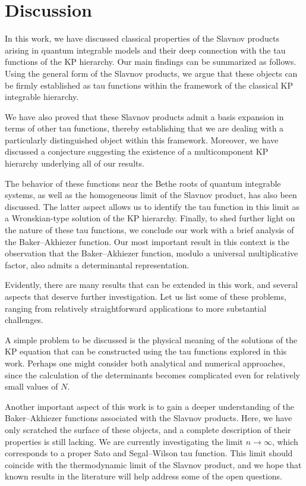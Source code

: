 \documentclass[a4paper,11pt]{amsart}
\begin{document}
\section{Discussion}

In this work, we have discussed classical properties of the Slavnov
products arising in quantum integrable models and their deep
connection with the tau functions of the KP hierarchy. Our main
findings can be summarized as follows. Using the general form of the
Slavnov products, we argue that these objects can be firmly
established as tau functions within the framework of the classical KP
integrable hierarchy.

We have also proved that these Slavnov products admit a basis
expansion in terms of other tau functions, thereby establishing that
we are dealing with a particularly distinguished object within this
framework. Moreover, we have discussed a conjecture suggesting the
existence of a multicomponent KP hierarchy underlying all of our
results.

The behavior of these functions near the Bethe roots of quantum
integrable systems, as well as the homogeneous limit of the Slavnov
product, has also been discussed. The latter aspect allows us to
identify the tau function in this limit as a Wronskian-type solution
of the KP hierarchy. Finally, to shed further light on the nature of
these tau functions, we conclude our work with a brief analysis of the
Baker--Akhiezer function. Our most important result in this context is
the observation that the Baker--Akhiezer function, modulo a universal
multiplicative factor, also admits a determinantal representation.

Evidently, there are many results that can be extended in this work,
and several aspects that deserve further investigation. Let us list
some of these problems, ranging from relatively straightforward
applications to more substantial challenges.

A simple problem to be discussed is the physical meaning of the
solutions of the KP equation that can be constructed using the tau
functions explored in this work. Perhaps one might consider both
analytical and numerical approaches, since the calculation of the
determinants becomes complicated even for relatively small values of
\(N\).

Another important aspect of this work is to gain a deeper
understanding of the Baker--Akhiezer functions associated with the
Slavnov products. Here, we have only scratched the surface of these
objects, and a complete description of their properties is still
lacking. We are currently investigating the limit \( n \to \infty \),
which corresponds to a proper Sato and Segal--Wilson tau
function. This limit should coincide with the thermodynamic limit of
the Slavnov product, and we hope that known results in the literature
will help address some of the open questions.
\end{document}
